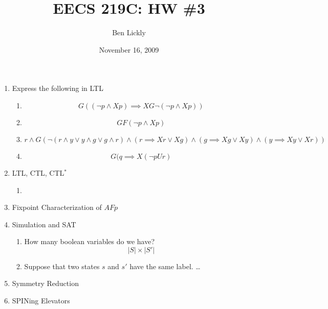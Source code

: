 \documentclass{article}
\title{EECS 219C: HW \#3}
\author{Ben Lickly}
\date{November 16, 2009}
\begin{document}
\maketitle
\begin{enumerate}
\item Express the following in LTL
  \begin{enumerate}
    \item \[G \left( (\neg p \wedge X p) \implies XG \neg (\neg p \wedge X p) \right) \]
    \item \[ GF (\neg p \wedge X p) \]
    \item \[ r \wedge G ( \neg ( r \wedge y \vee y \wedge g \vee g \wedge r)
      \wedge (r \implies X r \vee X g) \wedge (g \implies X g \vee X y)
      \wedge (y \implies X y \vee X r) ) \]
    \item \[G (q \implies X (\neg p U r)\]
  \end{enumerate}
\item LTL, CTL, CTL$^*$
  \begin{enumerate}
    \item %
  \end{enumerate}
\item Fixpoint Characterization of $AFp$
\item Simulation and SAT
  \begin{enumerate}
    \item How many boolean variables do we have?
      \[ |S| \times |S'| \]
    \item Suppose that two states $s$ and $s'$ have the same label. \dots
  \end{enumerate}
\item Symmetry Reduction
\item SPINing Elevators
\end{enumerate}

%
%
\end{document}
